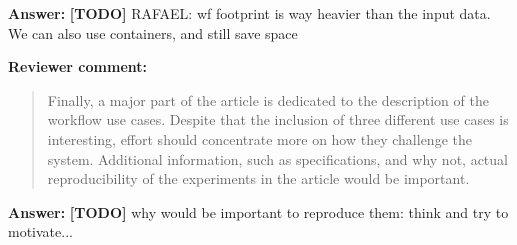 \documentclass{letter}
\newenvironment{review}%
{\textbf{Reviewer comment:}\begin{quote}}%
{\end{quote}}%
\newcommand{\todo}[1]{%
      \color{red}\textbf{[TODO]} #1\color{black}}
\newcommand{\answer}[1]{%
      \textbf{Answer:} #1}
\begin{document}
\begin{letter}{}
\answer{\todo{RAFAEL: wf footprint is way heavier than the input data. We can also use containers, and still save space}}


\begin{review}
Finally, a major part of the article is dedicated to the description of the workflow use cases. Despite that the inclusion of three different use cases is interesting, effort should concentrate more on how they challenge the system. Additional information, such as specifications, and why not, actual reproducibility of the experiments in the article would be important.
\end{review}

\answer{\todo{why would be important to reproduce them: think and try to motivate...}}


\end{letter}
\end{document}
